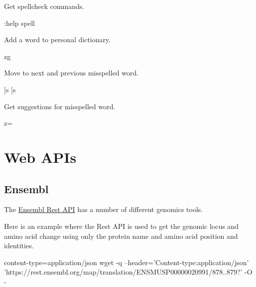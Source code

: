 \documentclass[]{book}
\newenvironment{Shaded}{\begin{snugshade}}{\end{snugshade}}
\newcommand{\StringTok}[1]{\textcolor[rgb]{0.31,0.60,0.02}{#1}}
\newcommand{\FunctionTok}[1]{\textcolor[rgb]{0.00,0.00,0.00}{#1}}
\newcommand{\VariableTok}[1]{\textcolor[rgb]{0.00,0.00,0.00}{#1}}
\newcommand{\ExtensionTok}[1]{#1}
\newcommand{\NormalTok}[1]{#1}
\begin{document}
Get spellcheck commands.

\begin{Shaded}
\begin{Highlighting}[]
\NormalTok{:}\ExtensionTok{help}\NormalTok{ spell}
\end{Highlighting}
\end{Shaded}

Add a word to personal dictionary.

\begin{Shaded}
\begin{Highlighting}[]
\ExtensionTok{zg}
\end{Highlighting}
\end{Shaded}

Move to next and previous misspelled word.

\begin{Shaded}
\begin{Highlighting}[]
\NormalTok{]}\ExtensionTok{s}
\NormalTok{[}\ExtensionTok{s}
\end{Highlighting}
\end{Shaded}

Get suggestions for misspelled word.

\begin{Shaded}
\begin{Highlighting}[]
\VariableTok{z=}
\end{Highlighting}
\end{Shaded}

\chapter{Web APIs}\label{apis}

\section{Ensembl}\label{ensembl}

The \href{https://rest.ensembl.org/}{Ensembl Rest API} has a number of
different genomics tools.

Here is an example where the Rest API is used to get the genomic locus
and amino acid change using only the protein name and amino acid
position and identities.

\begin{Shaded}
\begin{Highlighting}[]
\ExtensionTok{content-type}\NormalTok{=application/json}
\FunctionTok{wget}\NormalTok{ -q --header=}\StringTok{'Content-type:application/json'} \StringTok{'https://rest.ensembl.org/map/translation/ENSMUSP00000020991/878..879?'}\NormalTok{  -O -}
\end{Highlighting}
\end{Shaded}
\end{document}
